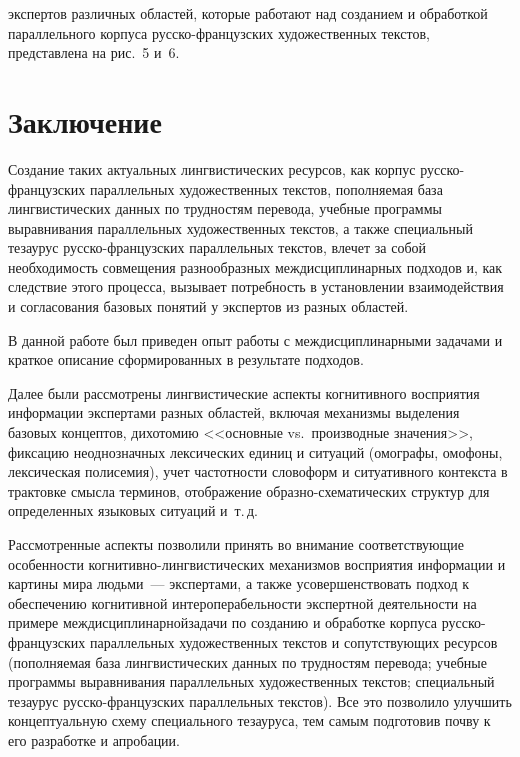 \begin{multicols}{2}

\noindent
 экспертов различных 
областей, которые работают над созданием и обработкой параллельного 
корпуса рус\-ско-фран\-цуз\-ских художественных текстов, представлена 
на рис.~5 и~6.


\vspace*{-6pt}     


\section{Заключение}

     Создание таких актуальных лингвистических ресурсов, как корпус 
рус\-ско-фран\-цуз\-ских параллельных художественных текстов, 
пополняемая \mbox{база} лингвистических данных по трудностям перевода, учебные 
программы выравнивания параллельных художественных текстов, а также 
специальный тезаурус рус\-ско-фран\-цуз\-ских параллельных текстов, влечет 
за собой необходимость совмещения разнообразных междисциплинарных 
подходов и, как следствие этого процесса, вызывает потребность в 
установлении взаимодействия и согласования базовых понятий у экспертов 
из разных об\-ластей.
     
     В данной работе был приведен опыт работы с междисциплинарными 
задачами и краткое описание сформированных в результате подходов. 

Далее 
были рассмотрены лингвистические аспекты когнитивного восприятия 
информации экспертами разных областей, включая механизмы выделения 
базовых концептов, дихотомию <<основные vs.\ производные значения>>, 
фиксацию неоднозначных лексических единиц и ситуаций (омографы, 
омофоны, лексическая полисемия), учет час\-тот\-ности словоформ и 
ситуативного контекста в трактовке смысла терминов, отображение 
     об\-раз\-но-схе\-ма\-ти\-че\-ских струк\-тур для определенных 
языковых ситуаций и~т.\,д.

\pagebreak
     
     Рассмотренные аспекты позволили принять во внимание 
соответствующие особенности ког\-ни\-тив\-но-линг\-ви\-сти\-че\-ских 
механизмов восприятия информации и картины мира людьми~--- 
экспертами, а также усовершенствовать подход к обеспечению когнитивной 
интероперабельности экспертной деятельности на примере 
междисциплинарной\linebreak задачи по созданию и обработке корпуса 
     рус\-ско-фран\-цуз\-ских параллельных художественных текстов и 
сопутствующих ресурсов (пополняемая \mbox{база} лингвистических данных по 
трудностям перевода; учебные программы выравнивания параллельных 
художественных текстов; специальный тезаурус рус\-ско-фран\-цуз\-ских 
параллельных текстов). Все это позволило улучшить концептуальную схему 
специального тезауруса, тем самым подготовив почву к его разработке и 
апробации.


\end{multicols}
